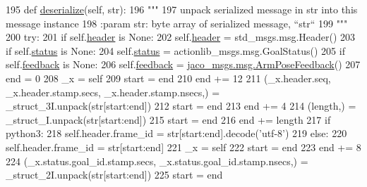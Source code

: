\begin{DoxyCode}
195   \textcolor{keyword}{def }\hyperlink{classjaco__msgs_1_1msg_1_1__ArmPoseActionFeedback_1_1ArmPoseActionFeedback_a7b867f771f5d087d508d7cf2c8a563f8}{deserialize}(self, str):
196     \textcolor{stringliteral}{"""}
197 \textcolor{stringliteral}{    unpack serialized message in str into this message instance}
198 \textcolor{stringliteral}{    :param str: byte array of serialized message, ``str``}
199 \textcolor{stringliteral}{    """}
200     \textcolor{keywordflow}{try}:
201       \textcolor{keywordflow}{if} self.\hyperlink{classjaco__msgs_1_1msg_1_1__ArmPoseActionFeedback_1_1ArmPoseActionFeedback_a29a02efc077766aa6b97432487639dfe}{header} \textcolor{keywordflow}{is} \textcolor{keywordtype}{None}:
202         self.\hyperlink{classjaco__msgs_1_1msg_1_1__ArmPoseActionFeedback_1_1ArmPoseActionFeedback_a29a02efc077766aa6b97432487639dfe}{header} = std\_msgs.msg.Header()
203       \textcolor{keywordflow}{if} self.\hyperlink{classjaco__msgs_1_1msg_1_1__ArmPoseActionFeedback_1_1ArmPoseActionFeedback_a401e259f50e0f76aa3b79d712f3ef72c}{status} \textcolor{keywordflow}{is} \textcolor{keywordtype}{None}:
204         self.\hyperlink{classjaco__msgs_1_1msg_1_1__ArmPoseActionFeedback_1_1ArmPoseActionFeedback_a401e259f50e0f76aa3b79d712f3ef72c}{status} = actionlib\_msgs.msg.GoalStatus()
205       \textcolor{keywordflow}{if} self.\hyperlink{classjaco__msgs_1_1msg_1_1__ArmPoseActionFeedback_1_1ArmPoseActionFeedback_a3c9079d060107fb271e00b9cc073b42c}{feedback} \textcolor{keywordflow}{is} \textcolor{keywordtype}{None}:
206         self.\hyperlink{classjaco__msgs_1_1msg_1_1__ArmPoseActionFeedback_1_1ArmPoseActionFeedback_a3c9079d060107fb271e00b9cc073b42c}{feedback} = \hyperlink{classjaco__msgs_1_1msg_1_1__ArmPoseFeedback_1_1ArmPoseFeedback}{jaco\_msgs.msg.ArmPoseFeedback}()
207       end = 0
208       \_x = self
209       start = end
210       end += 12
211       (\_x.header.seq, \_x.header.stamp.secs, \_x.header.stamp.nsecs,) = \_struct\_3I.unpack(str[start:end])
212       start = end
213       end += 4
214       (length,) = \_struct\_I.unpack(str[start:end])
215       start = end
216       end += length
217       \textcolor{keywordflow}{if} python3:
218         self.header.frame\_id = str[start:end].decode(\textcolor{stringliteral}{'utf-8'})
219       \textcolor{keywordflow}{else}:
220         self.header.frame\_id = str[start:end]
221       \_x = self
222       start = end
223       end += 8
224       (\_x.status.goal\_id.stamp.secs, \_x.status.goal\_id.stamp.nsecs,) = \_struct\_2I.unpack(str[start:end])
225       start = end

\end{DoxyCode}

